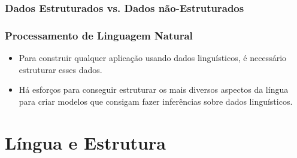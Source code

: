 \documentclass[11pt]{beamer}
\begin{document}
\begin{frame}
\frametitle{Dados Estruturados vs. Dados não-Estruturados}
	\begin{table}[]
		\centering
		
		\label{my-label}
	\end{table}
\end{frame}

\begin{frame}
\frametitle{Processamento de Linguagem Natural}
\begin{itemize}
	\item Para construir qualquer aplicação usando dados linguísticos, é necessário estruturar esses dados.\\
	\item Há esforços para conseguir estruturar os mais diversos aspectos da língua para criar modelos que consigam fazer inferências sobre dados linguísticos.\\
\end{itemize}
\end{frame}


\section{Língua e Estrutura}
\end{document}

